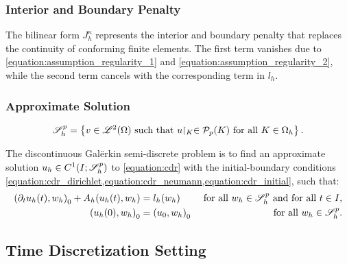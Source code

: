 \newpage
\subsubsection{Interior and Boundary Penalty}

The bilinear form $J^{\kappa}_h$ represents the interior and boundary penalty that replaces the continuity of conforming finite elements. The first term vanishes due to \cref{equation:assumption_regularity_1} and \cref{equation:assumption_regularity_2}, while the second term cancels with the corresponding term in $l_h$.

\subsubsection{Approximate Solution}

\begin{definition}[$\SpaceSolution_h^p$]
    \begin{align}
        \mathscr{S}_h^p = \left\{ v \in \mathscr{L}^{2}(\Omega) \text{ such that } u \!\!\restriction_{K} \in \mathcal{P}_{p}(K) \text{ for all } K \in \Omega_h \right\}.
    \end{align}
\end{definition}

The discontinuous Galërkin semi-discrete problem is to find an approximate solution $u_h \in C^1(I; \mathscr{S}_h^p)$ to \cref{equation:cdr} with the initial-boundary conditions \cref{equation:cdr_dirichlet,equation:cdr_neumann,equation:cdr_initial}, such that:
\begin{align}
    \left( \partial_t u_h(t), w_h \right)_0 + A_h(u_h(t), w_h) &= l_h(w_h) &\text{ for all } w_h \in \mathscr{S}_h^p \text{ and for all } t \in I, \\
    \left( u_h(0), w_h \right)_0 &= \left( u_0, w_h \right)_0 &\text{ for all } w_h \in \mathscr{S}_h^p.
\end{align}

\newpage
\subsection{Time Discretization Setting}

